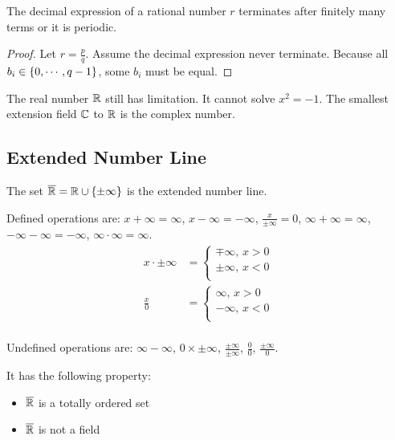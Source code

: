 \begin{theorem}
    The decimal expression of a rational number $r$ terminates after finitely many terms or it is periodic.    
\end{theorem}
\begin{proof}
    Let $r = \frac{p}{q}$. Assume the decimal expression never terminate. Because all $b_i \in \set{0, \cdots, q -1}$, some $b_i$ must be equal.
\end{proof}





The real number $\mathbb{R}$ still has limitation. It cannot solve $x^2 = -1$. The smallest extension field $\mathbb{C}$ to $\mathbb{R}$ is the complex number.



\subsection{Extended Number Line}

\begin{definition}
    The set $\overline{\mathbb{R}} = \mathbb{R} \cup \set{\pm \infty}$ is the extended number line. 
    
    Defined operations are: $x + \infty = \infty$, $x - \infty = -\infty$, $\displaystyle \frac{x}{\pm \infty} = 0$, $\infty + \infty = \infty$, $- \infty - \infty = - \infty$, $\infty \cdot \infty = \infty$.
    \begin{equation}
        \begin{aligned}
            x \cdot \pm \infty &= \begin{cases}
                \mp \infty \text{, } x > 0 \\
                \pm \infty \text{, } x < 0 \\
            \end{cases} \\
            \frac{x}{0} &= \begin{cases}
                \infty \text{, } x > 0 \\
                -\infty \text{, } x < 0 \\
            \end{cases} \\
        \end{aligned}
    \end{equation}
    
    Undefined operations are: $\infty - \infty$, $0 \times \pm \infty$, $\displaystyle \frac{\pm \infty}{\pm \infty}$, $\displaystyle \frac{0}{0}$, $\displaystyle \frac{\pm \infty}{0}$.
    
    It has the following property:
    \begin{itemize}
        \item $\overline{\mathbb{R}}$ is a totally ordered set
        \item $\overline{\mathbb{R}}$ is not a field
    \end{itemize}
\end{definition}


